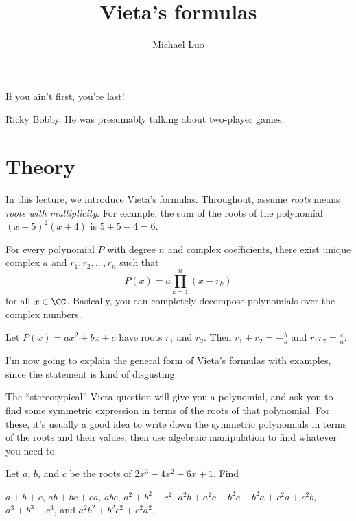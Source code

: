 \documentclass[11pt]{scrartcl}
\title{Vieta's formulas}
\author{Michael Luo}
\begin{document}
\maketitle

\epigraph{If you ain't first, you're last!}{Ricky Bobby. He was presumably talking about two-player games.}

\section{Theory}

In this lecture, we introduce Vieta's formulas. Throughout, assume \emph{roots} means \emph{roots with multiplicity}. For example, the sum of the roots of the polynomial $(x - 5)^2(x + 4)$ is $5 + 5 - 4 = 6$.

\begin{theorem}
	For every polynomial $P$ with degree $n$ and complex coefficients, there exist unique complex $a$ and $r_1,r_2,\dots,r_n$ such that
	\[P(x) = a\prod_{k = 1}^{n}(x - r_k)\]
	for all $x \in \CC$. Basically, you can completely decompose polynomials over the complex numbers.
\end{theorem}

\begin{theorem}
    Let $P(x) = ax^2 + bx + c$ have roots $r_1$ and $r_2$. Then $r_1 + r_2 = -\frac{b}{a}$ and $r_1r_2 = \frac{c}{a}$.
\end{theorem}

I'm now going to explain the general form of Vieta's formulas with examples, since the statement is kind of disgusting.

The ``stereotypical'' Vieta question will give you a polynomial, and ask you to find some symmetric expression in terms of the roots of that polynomial. For these, it's usually a good idea to write down the symmetric polynomials in terms of the roots and their values, then use algebraic manipulation to find whatever you need to. 

\begin{example}
	Let $a$, $b$, and $c$ be the roots of $2x^3 - 4x^2 - 6x + 1$. Find
	\begin{itemize}
		\ii $a + b + c$,
		\ii $ab + bc + ca$,
		\ii $abc$,
		\ii $a^2 + b^2 + c^2$,
		\ii $a^2b + a^2c + b^2c + b^2a + c^2a + c^2b$,
		\ii $a^3 + b^3 + c^3$,
		\ii and $a^2b^2 + b^2c^2 + c^2a^2$.
	\end{itemize}
\end{example}
\end{document}
